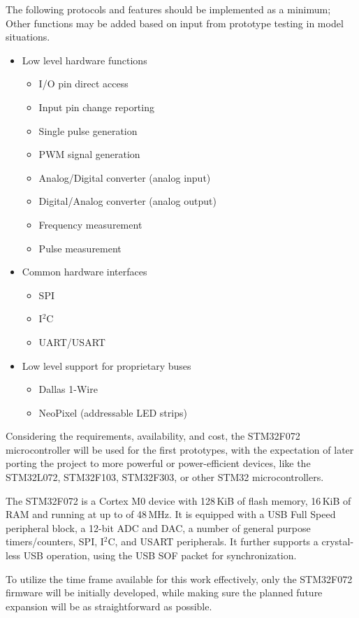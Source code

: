 The following protocols and features should be implemented as a minimum; Other functions may be added based on input from prototype testing in model situations. 

\begin{itemize}
	\item Low level hardware functions
		\begin{itemize}
			\item I/O pin direct access
			\item Input pin change reporting
			\item Single pulse generation
			\item PWM signal generation
			\item Analog/Digital converter (analog input)
			\item Digital/Analog converter (analog output)
			\item Frequency measurement
			\item Pulse measurement
		\end{itemize}
	\item Common hardware interfaces
		\begin{itemize}
			\item SPI
			\item I$^2$C
			\item UART/USART
		\end{itemize}
	\item Low level support for proprietary buses
		\begin{itemize}
			\item Dallas 1-Wire
			\item NeoPixel (addressable LED strips)
		\end{itemize}
\end{itemize}

Considering the requirements, availability, and cost, the STM32F072 microcontroller will be used for the first prototypes, with the expectation of later porting the project to more powerful or power-efficient devices, like the STM32L072, STM32F103, STM32F303, or other STM32 microcontrollers. 

The STM32F072 is a Cortex M0 device with 128\,KiB of flash memory, 16\,KiB of RAM and running at up to of 48\,MHz. It is equipped with a USB Full Speed peripheral block, a 12-bit ADC and DAC, a number of general purpose timers/counters, SPI, I$^2$C, and USART peripherals. It further supports a crystal-less USB operation, using the USB SOF packet for synchronization.

To utilize the time frame available for this work effectively, only the STM32F072 firmware will be initially developed, while making sure the planned future expansion will be as straightforward as possible.





